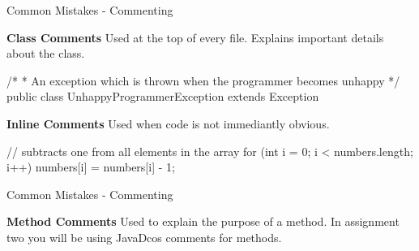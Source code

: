 \documentclass[12]{beamer}
\begin{document}
\begin{frame}[t, fragile]{Common Mistakes - Commenting} \vspace{4pt}

\textbf{Class Comments}
Used at the top of every file. Explains important details about the class.

\begin{java}
/*
 * An exception which is thrown when the programmer becomes unhappy
 */
 public class UnhappyProgrammerException extends Exception {

 }
\end{java}

\textbf{Inline Comments}
Used when code is not immediantly obvious.

\begin{java}
// subtracts one from all elements in the array
for (int i = 0; i < numbers.length; i++) {
    numbers[i] = numbers[i] - 1;
}
\end{java}

\end{frame}

\begin{frame}[t, fragile]{Common Mistakes - Commenting} \vspace{4pt}

\textbf{Method Comments}
Used to explain the purpose of a method. In assignment two you will
be using JavaDcos comments for methods.

\end{frame}
\end{document}
